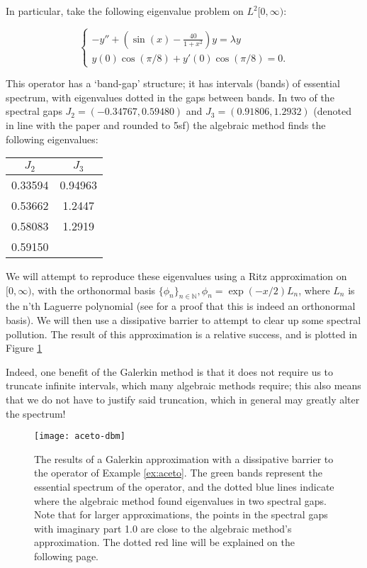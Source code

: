 \documentclass[../main.tex]{subfiles}
\begin{document}
\begin{example}\label{ex:aceto} In particular, take the following eigenvalue
	problem on $L^2[0, \infty)$:

$$ \begin{cases} -y'' + (\sin(x) - \frac{40}{1+x^2})y = \lambda y \\ y(0)
\cos(\pi/8) + y'(0) \cos(\pi/8) = 0. \end{cases} $$

This operator has a `band-gap' structure; it has intervals (bands) of essential
spectrum, with eigenvalues dotted in the gaps between bands. In two of
the spectral gaps $J_2 = (-0.34767, 0.59480)$ and $J_3 = (0.91806,
1.2932)$ (denoted in line with the paper and rounded to 5sf) the
algebraic method finds the following eigenvalues:

\begin{figure*}[h!]
\centering \begin{tabular}{c c}
  $J_2$ & $J_3$ \\
  \hline\hline
  0.33594 & 0.94963 \\
  0.53662 & 1.2447 \\
  0.58083 & 1.2919 \\
  0.59150 & \\
\end{tabular}
\end{figure*}

We will attempt to reproduce these eigenvalues using a
Ritz approximation on $[0, \infty)$, with the orthonormal basis
$\{\phi_n\}_{n \in \mathbb{N}}, \phi_n = \exp(-x/2)L_n$, where $L_n$ is
the n'th Laguerre polynomial (see \cite{szego1975orthogonal} for a proof
that this is indeed an orthonormal basis). We will then use a dissipative
barrier to attempt to clear up some spectral pollution.
The result of this approximation is a relative success, 
and is plotted in Figure \ref{fig:aceto-dbm}

Indeed, one benefit of the Galerkin method is that it does not require us to
truncate infinite intervals, which many algebraic methods require; this also
means that we do not have to justify said truncation, which in general may
greatly alter the spectrum!
\end{example}

\begin{figure}[p!]
\centering
\texttt{[image: aceto-dbm]}
\caption{The results of a Galerkin approximation with a dissipative
	barrier to the operator of Example \ref{ex:aceto}. The green bands
	represent the essential spectrum of the operator, and the dotted blue
	lines indicate where the algebraic method found eigenvalues in two
	spectral gaps. Note that for larger approximations, the points in the
	spectral gaps with imaginary part 1.0 are close to the algebraic
	method's approximation. The dotted red line will be explained on
  the following page.}
\label{fig:aceto-dbm}
\end{figure}
\end{document}
